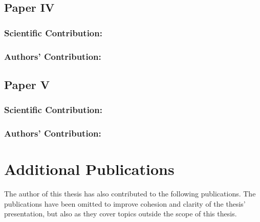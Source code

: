 \clearpage %

\subsection*{Paper IV}%
%
\begin{quote}
\end{quote}

\subsubsection*{Scientific Contribution:}%
%
\subsubsection*{Authors' Contribution:}%
%


\clearpage %

\subsection*{Paper V}%
%
\begin{quote}
\end{quote}

\subsubsection*{Scientific Contribution:}%
%
\subsubsection*{Authors' Contribution:}%
%


\clearpage %

\section{Additional Publications}%
\label{sec:additional-publications}%
%
The author of this thesis has also contributed to the following publications.
The publications have been omitted to improve cohesion and clarity of the thesis' presentation, but also as they cover topics outside the scope of this thesis.

\begin{quote}
\end{quote}

\begin{quote}
\end{quote}

\begin{quote}
\end{quote}

\begin{quote}
\end{quote}

\begin{quote}
\end{quote}
